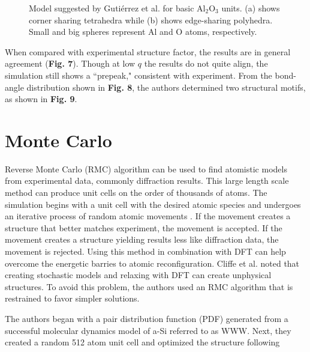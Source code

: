 \documentclass[3p,review,12pt]{elsarticle}
\begin{document}
\begin{figure}[H]
\begin{minipage}[b]{0.45\textwidth}
		\centering
		\caption{Model suggested by Guti\'errez et al. \cite{Gutierrez2002} for basic Al$_{2}$O$_{3}$ units. (a) shows corner sharing tetrahedra while (b) shows edge-sharing polyhedra. Small and big spheres represent Al and O atoms, respectively. }
	\end{minipage}
\end{figure}
\par 
When compared with experimental structure factor, the results are in general agreement (\textbf{Fig. 7}). Though at low $q$ the results do not quite align, the simulation still shows a ``prepeak," consistent with experiment. From the bond-angle distribution shown in \textbf{Fig. 8}, the authors determined two structural motifs, as shown in \textbf{Fig. 9}.


\section{Monte Carlo}
Reverse Monte Carlo (RMC) algorithm can be used to find atomistic models from experimental data, commonly diffraction results. This large length scale method can produce unit cells on the order of thousands of atoms. The simulation begins with a unit cell with the desired atomic species and undergoes an iterative process of random atomic movements \cite{Cliffe2017}. If the movement creates a structure that better matches experiment, the movement is accepted. If the movement creates a structure yielding results less like diffraction data, the movement is rejected. Using this method in combination with DFT can help overcome the energetic barries to atomic reconfiguration. Cliffe et al. \cite{Cliffe2017} noted that creating stochastic models and relaxing with DFT can create unphysical structures. To avoid this problem, the authors used an RMC algorithm that is restrained to favor simpler solutions.
\par 
The authors began with a pair distribution function (PDF) generated from a  successful molecular dynamics model of a-Si referred to as WWW. Next, they created a random 512 atom unit cell and optimized the structure following
\end{document}

